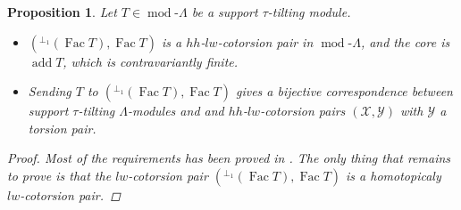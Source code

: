 \documentclass[12pt]{amsart}
\numberwithin{equation}{section}
\newtheorem{proposition}[lemma]{Proposition}
\theoremstyle{definition}
\DeclareMathOperator{\modd}{mod}
\DeclareMathOperator{\add}{add}
\DeclareMathOperator{\Fac}{Fac}
\newtheorem*{theorem 0*}{Theorem}
\newtheorem*{theorem a*}{Theorem A}
\newtheorem*{theorem b*}{Theorem B}
\numberwithin{diagram}{section}
\begin{document}
\begin{proposition}\label{4.4}
Let $T\in \modd\text{-}\Lambda$ be a support $\tau$-tilting module.
\begin{itemize}
\item[(1)]
$({}^{\perp_1}(\Fac T),\Fac T)$ is a $hh$-$lw$-cotorsion pair in $\modd\text{-}\Lambda$, and the core is $\add T$, which is contravariantly finite.
\item[(2)]
Sending $T$ to $({}^{\perp_1}(\Fac T),\Fac T)$ gives a bijective correspondence between support $\tau$-tilting $\Lambda$-modules and and $hh$-$lw$-cotorsion pairs $(\mathcal{X},\mathcal{Y})$ with $\mathcal{Y}$ a torsion pair.
\end{itemize}
\begin{proof}
Most of the requirements has been proved in \cite{BZ}.
The only thing that remains to prove is that the $lw$-cotorsion pair $({}^{\perp_1}(\Fac T),\Fac T)$ is a homotopicaly $lw$-cotorsion pair.


\end{proof}
\end{proposition}
\end{document}
